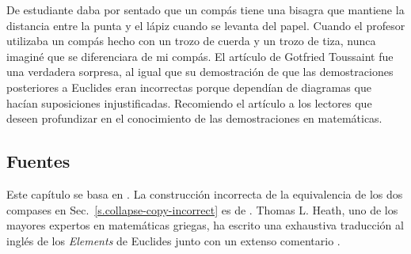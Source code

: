 De estudiante daba por sentado que un compás tiene una bisagra que mantiene la distancia entre la punta y el lápiz cuando se levanta del papel. Cuando el profesor utilizaba un compás hecho con un trozo de cuerda y un trozo de tiza, nunca imaginé que se diferenciara de mi compás. El artículo de Gotfried Toussaint fue una verdadera sorpresa, al igual que su demostración de que las demostraciones posteriores a Euclides eran incorrectas porque dependían de diagramas que hacían suposiciones injustificadas. Recomiendo el artículo a los lectores que deseen profundizar en el conocimiento de las demostraciones en matemáticas.

\subsection*{Fuentes}

Este capítulo se basa en \cite{toussaint}. La construcción incorrecta de la equivalencia de los dos compases en Sec.~\ref{s.collapse-copy-incorrect} es de \cite{rusty}. Thomas L. Heath, uno de los mayores expertos en matemáticas griegas, ha escrito una exhaustiva traducción al inglés de los \textit{Elements} de Euclides junto con un extenso comentario \cite{euclid}.
